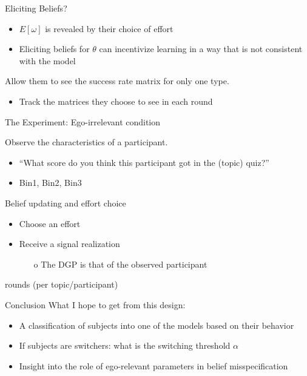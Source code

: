 \documentclass[aspectratio=169]{beamer}
\begin{document}
\begin{frame}{Eliciting Beliefs?}
\begin{itemize}
    \item $E[\omega]$ is revealed by their choice of effort\\
    \bigskip
    \item Eliciting beliefs for $\theta$ can incentivize learning in a way that is not consistent with the model\\
    \bigskip
\end{itemize}

Allow them to see the success rate matrix for only one type. 
\begin{itemize}
    \item Track the matrices they choose to see in each round
\end{itemize}



\end{frame}

\begin{frame}{The Experiment: Ego-irrelevant condition}

Observe the characteristics of a participant. 
\begin{itemize}
    \item ``What score do you think this participant got in the (topic) quiz?'' 
    \item Bin1, Bin2, Bin3 
\end{itemize}

Belief updating and effort choice\\
\bigskip
\begin{itemize}
    \item Choose an effort
    \item Receive a signal realization
    \begin{itemize}
        \item[o] The DGP is that of the observed participant
    \end{itemize}
\end{itemize}
 rounds (per topic/participant)

\end{frame}

\begin{frame}{Conclusion}
What I hope to get from this design:\\
\bigskip
    \begin{itemize}
        \item A classification of subjects into one of the models based on their behavior\\
        \bigskip
        \item If subjects are switchers: what is the switching threshold $\alpha$\\
        \bigskip
        \item Insight into the role of ego-relevant parameters in belief misspecification
    \end{itemize}
\end{frame}
\end{document}
